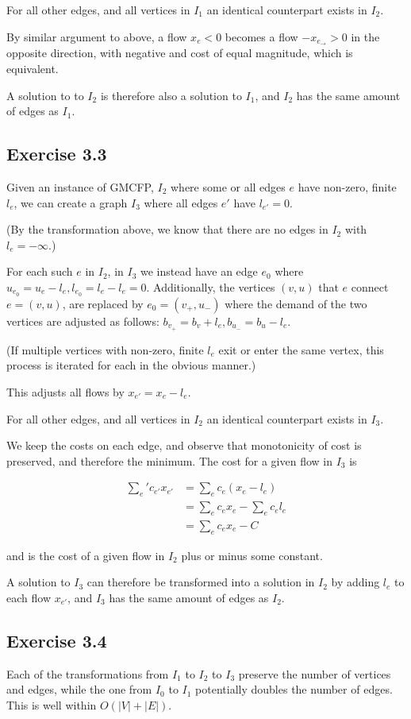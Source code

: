For all other edges, and all vertices in $I_1$ an identical counterpart exists in $I_2$.

By similar argument to above, a flow $x_e < 0$ becomes a flow $-x_{e_{\rightarrow}} > 0$ in the
opposite direction, with negative and cost of equal magnitude, which is equivalent.

A solution to to $I_2$ is therefore also a solution to $I_1$, and $I_2$ has the same
amount of edges as $I_1$.

\subsection{Exercise 3.3}

Given an instance of GMCFP, $I_2$ where some or all edges $e$ have non-zero, finite $l_e$, we can
create a graph $I_3$ where all edges $e'$ have $l_{e'} = 0$.

(By the transformation above, we know that there are no edges in $I_2$ with $l_e = -\infty$.)

For each such $e$ in $I_2$, in $I_3$ we instead have an edge $e_0$ where
$u_{e_0} = u_e - l_e, l_{e_0} = l_e - l_e = 0$. Additionally, the vertices $(v,u)$ that $e$ connect $e = (v, u)$, 
are replaced by $e_0 = (v_+, u_-)$ where the demand of the two vertices are adjusted as follows:
$b_{v_+} = b_v + l_e, b_{u_-} = b_u - l_e$.

(If multiple vertices with non-zero, finite $l_e$ exit or enter the same vertex, this process is
iterated for each in the obvious manner.)

This adjusts all flows by $x_{e'} = x_{e} - l_{e}$.

For all other edges, and all vertices in $I_2$ an identical counterpart exists in $I_3$.

We keep the costs on each edge, and observe that monotonicity of cost is preserved, and therefore
the minimum. The cost for a given flow in $I_3$ is

\begin{align*}
  \sum_e' c_{e'} x_{e'} &= \sum_e c_{e} ( x_{e} - l_{e} ) \\
  &= \sum_e c_{e} x_{e} - \sum_e c_{e} l_{e} \\
  &= \sum_e c_e x_e - C
\end{align*}

and is the cost of a given flow in $I_2$ plus or minus some constant.

A solution to $I_3$ can therefore be transformed into a solution in $I_2$ by
adding $l_e$ to each flow $x_{e'}$, and $I_3$ has the same amount of edges as $I_2$.

\subsection{Exercise 3.4}

Each of the transformations from $I_1$ to $I_2$ to $I_3$ preserve the number of vertices and
edges, while the one from $I_0$ to $I_1$ potentially doubles the number of edges. This is 
well within $O(|V| + |E|)$.
